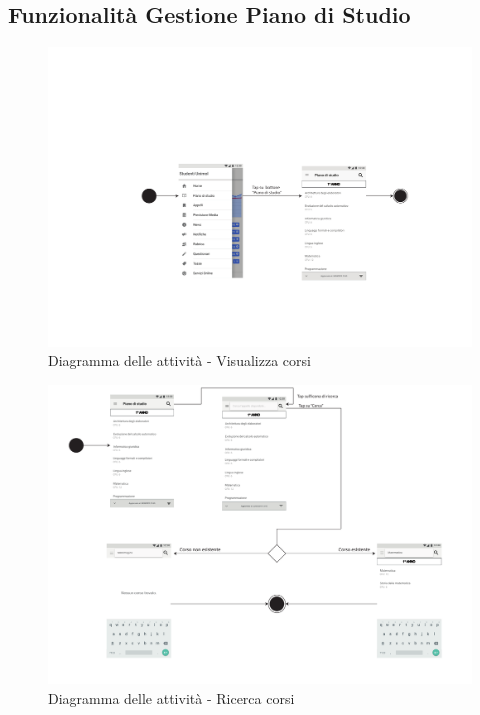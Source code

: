 \subsection{Funzionalità Gestione Piano di Studio}
\begin{figure}[h]
	\centering
	\includegraphics[width=6in]{imgs/gruppo1/activity_diagrams/AD1_Visualizza_corsi.pdf}
	\caption{Diagramma delle attività - Visualizza corsi}
	\label{diag:visualizzaCorsiAD}
\end{figure}
\newpage

\begin{figure}[h]
	\centering
	\includegraphics[width=6in]{imgs/gruppo1/activity_diagrams/AD2_ricerca_corsi.pdf}
	\caption{Diagramma delle attività - Ricerca corsi}
	\label{diag:ricercaCorsiAD}
\end{figure}
\newpage

